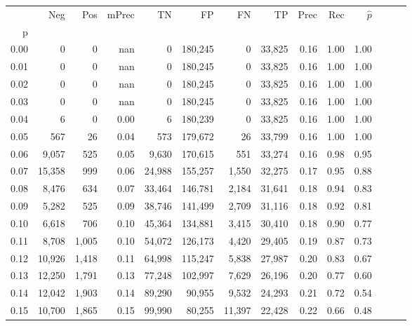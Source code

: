 \begin{tabular}{rrrrrrrrrrrrrr}
\toprule
{} &     Neg &    Pos & mPrec &       TN &       FP &      FN &      TP &  Prec &   Rec & $\hat{p}$ \\
p    &         &        &       &          &          &         &         &       &       &           \\
\midrule
0.00 &       0 &      0 &   nan &        0 &  180,245 &       0 &  33,825 &  0.16 &  1.00 &      1.00 \\
0.01 &       0 &      0 &   nan &        0 &  180,245 &       0 &  33,825 &  0.16 &  1.00 &      1.00 \\
0.02 &       0 &      0 &   nan &        0 &  180,245 &       0 &  33,825 &  0.16 &  1.00 &      1.00 \\
0.03 &       0 &      0 &   nan &        0 &  180,245 &       0 &  33,825 &  0.16 &  1.00 &      1.00 \\
0.04 &       6 &      0 &  0.00 &        6 &  180,239 &       0 &  33,825 &  0.16 &  1.00 &      1.00 \\
0.05 &     567 &     26 &  0.04 &      573 &  179,672 &      26 &  33,799 &  0.16 &  1.00 &      1.00 \\
0.06 &   9,057 &    525 &  0.05 &    9,630 &  170,615 &     551 &  33,274 &  0.16 &  0.98 &      0.95 \\
0.07 &  15,358 &    999 &  0.06 &   24,988 &  155,257 &   1,550 &  32,275 &  0.17 &  0.95 &      0.88 \\
0.08 &   8,476 &    634 &  0.07 &   33,464 &  146,781 &   2,184 &  31,641 &  0.18 &  0.94 &      0.83 \\
0.09 &   5,282 &    525 &  0.09 &   38,746 &  141,499 &   2,709 &  31,116 &  0.18 &  0.92 &      0.81 \\
0.10 &   6,618 &    706 &  0.10 &   45,364 &  134,881 &   3,415 &  30,410 &  0.18 &  0.90 &      0.77 \\
0.11 &   8,708 &  1,005 &  0.10 &   54,072 &  126,173 &   4,420 &  29,405 &  0.19 &  0.87 &      0.73 \\
0.12 &  10,926 &  1,418 &  0.11 &   64,998 &  115,247 &   5,838 &  27,987 &  0.20 &  0.83 &      0.67 \\
0.13 &  12,250 &  1,791 &  0.13 &   77,248 &  102,997 &   7,629 &  26,196 &  0.20 &  0.77 &      0.60 \\
0.14 &  12,042 &  1,903 &  0.14 &   89,290 &   90,955 &   9,532 &  24,293 &  0.21 &  0.72 &      0.54 \\
0.15 &  10,700 &  1,865 &  0.15 &   99,990 &   80,255 &  11,397 &  22,428 &  0.22 &  0.66 &      0.48 \\

\end{tabular}
